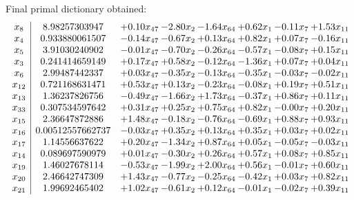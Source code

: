 \documentclass[8pt]{article}
\begin{document}
 Final primal dictionary obtained: 
\[\begin{array}{c| c c@{\hskip 2pt} c@{\hskip 2pt} c@{\hskip 2pt} c@{\hskip 2pt} c@{\hskip 2pt} c@{\hskip 2pt} }
 x_{8}   &  8.98257303947 & +  0.10 x_{47} & -2.80 x_{2} & -1.64 x_{64} & +  0.62 x_{1} & -0.11 x_{7} & +  1.53 x_{11}\\
 x_{4}   &  0.933880061507 & -0.14 x_{47} & -0.67 x_{2} & +  0.13 x_{64} & +  0.82 x_{1} & +  0.07 x_{7} & -0.16 x_{11}\\
 x_{5}   &  3.91030240902 & -0.01 x_{47} & -0.70 x_{2} & -0.26 x_{64} & -0.57 x_{1} & -0.08 x_{7} & +  0.15 x_{11}\\
 x_{3}   &  0.241414659149 & +  0.17 x_{47} & +  0.58 x_{2} & -0.12 x_{64} & -1.36 x_{1} & +  0.07 x_{7} & +  0.04 x_{11}\\
 x_{6}   &  2.99487442337 & +  0.03 x_{47} & -0.35 x_{2} & -0.13 x_{64} & -0.35 x_{1} & -0.03 x_{7} & -0.02 x_{11}\\
 x_{12}   &  0.721168631471 & +  0.53 x_{47} & +  0.13 x_{2} & -0.23 x_{64} & -0.08 x_{1} & +  0.19 x_{7} & +  0.51 x_{11}\\
 x_{13}   &  1.36237826756 & -0.49 x_{47} & -1.66 x_{2} & +  1.73 x_{64} & -0.37 x_{1} & +  0.86 x_{7} & +  0.11 x_{11}\\
 x_{33}   &  0.307534597642 & +  0.31 x_{47} & +  0.25 x_{2} & +  0.75 x_{64} & +  0.82 x_{1} & -0.00 x_{7} & +  0.20 x_{11}\\
 x_{15}   &  2.36647872886 & +  1.48 x_{47} & -0.18 x_{2} & -0.76 x_{64} & -0.69 x_{1} & +  0.88 x_{7} & +  0.93 x_{11}\\
 x_{16}   &  0.00512557662737 & -0.03 x_{47} & +  0.35 x_{2} & +  0.13 x_{64} & +  0.35 x_{1} & +  0.03 x_{7} & +  0.02 x_{11}\\
 x_{17}   &  1.14556637622 & +  0.20 x_{47} & -1.34 x_{2} & +  0.87 x_{64} & +  0.05 x_{1} & -0.05 x_{7} & -0.03 x_{11}\\
 x_{14}   &  0.089697590979 & +  0.01 x_{47} & -0.30 x_{2} & +  0.26 x_{64} & +  0.57 x_{1} & +  0.08 x_{7} & +  0.85 x_{11}\\
 x_{19}   &  1.46027678114 & -0.53 x_{47} & -1.99 x_{2} & +  2.00 x_{64} & +  0.56 x_{1} & -0.01 x_{7} & +  0.60 x_{11}\\
 x_{20}   &  2.46642747309 & +  1.43 x_{47} & -0.77 x_{2} & -0.25 x_{64} & -0.42 x_{1} & +  0.03 x_{7} & +  0.82 x_{11}\\
 x_{21}   &  1.99692465402 & +  1.02 x_{47} & -0.61 x_{2} & +  0.12 x_{64} & -0.01 x_{1} & -0.02 x_{7} & +  0.39 x_{11}\\

\end{array}\]
\end{document}
